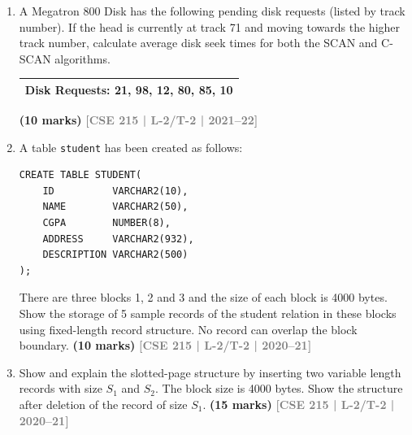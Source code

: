 \documentclass[12pt]{article}
\newcommand{\yr}[1]{\hfill\textcolor{gray}{\small\textbf{[#1]}}}
\newcommand{\mk}[1]{\textcolor{orange!70!black}{\small\textbf{(#1 marks)}}}
\begin{document}
\begin{enumerate}
\begin{center}
\end{center}
\mk{10} \yr{CSE 215 | L-2/T-2 | 2021--22}


\item A Megatron 800 Disk has the following pending disk requests (listed by track number). If the head is currently at track 71 and moving towards the higher track number, calculate average disk seek times for both the SCAN and C-SCAN algorithms.
\medskip
\begin{center}
\begin{tabular}{l}
\toprule
\textbf{Disk Requests}: 21, 98, 12, 80, 85, 10\\
\bottomrule
\end{tabular}
\end{center}
\mk{10} \yr{CSE 215 | L-2/T-2 | 2021--22}


\item A table \texttt{student} has been created as follows:
\begin{lstlisting}
CREATE TABLE STUDENT(
    ID          VARCHAR2(10),
    NAME        VARCHAR2(50),
    CGPA        NUMBER(8),
    ADDRESS     VARCHAR2(932),
    DESCRIPTION VARCHAR2(500)
);
\end{lstlisting}
There are three blocks 1, 2 and 3 and the size of each block is 4000 bytes. Show the storage of 5 sample records of the student relation in these blocks using fixed-length record structure. No record can overlap the block boundary.
\mk{10} \yr{CSE 215 | L-2/T-2 | 2020--21}


\item Show and explain the slotted-page structure by inserting two variable length records with size $S_1$ and $S_2$. The block size is 4000 bytes. Show the structure after deletion of the record of size $S_1$.
\mk{15} \yr{CSE 215 | L-2/T-2 | 2020--21}



\end{enumerate}
\end{document}
